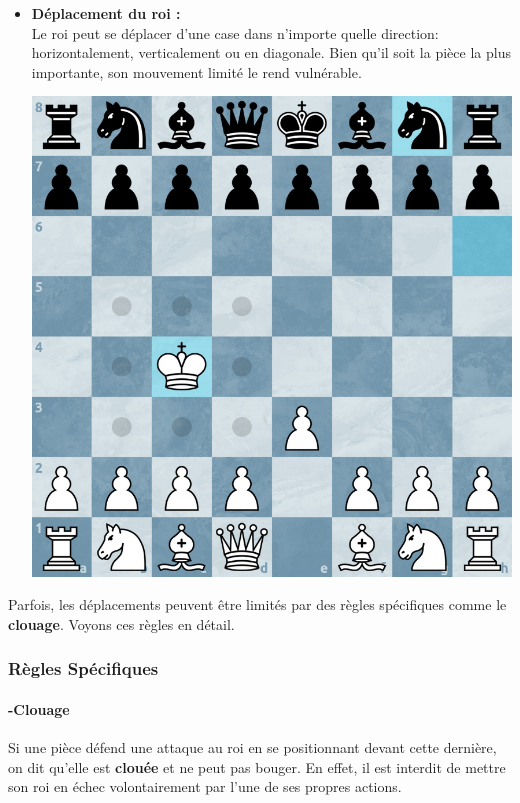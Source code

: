 \documentclass{article}
\begin{document}
\begin{itemize}
    \item \begin{minipage}{0.45\textwidth}
        \textbf{Déplacement du roi :} \\
        Le roi peut se déplacer d'une case dans n'importe quelle direction: horizontalement, verticalement ou en diagonale.
        Bien qu'il soit la pièce la plus importante, son mouvement limité le rend vulnérable.
    \end{minipage}
    \hspace{0.05\textwidth}
    \begin{minipage}{0.45\textwidth}
        \centering
        \includegraphics[width=\textwidth]{roiMove.png}
    \end{minipage}

\end{itemize}

\vspace{0.5cm}

Parfois, les déplacements peuvent être limités par des règles spécifiques comme le \textbf{clouage}. Voyons ces règles en détail.

\subsubsection{Règles Spécifiques}
\paragraph{-Clouage} Si une pièce défend une attaque au roi en se positionnant devant cette dernière, on dit qu’elle est \textbf{clouée}
 et ne peut pas bouger. En effet, il est interdit de mettre son roi en échec volontairement par l’une de ses propres actions.
\end{document}
